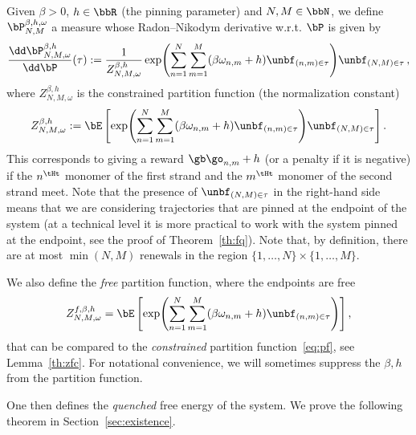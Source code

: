Given $\beta >0$, $h \in \bbR$ (the pinning parameter) and $N,M \in \bbN$, we define $\bP_{N,M}^{\beta,h,\omega}$ a measure whose Radon--Nikodym derivative w.r.t. $\bP$ is given by
\begin{equation}
\frac{\dd \bP_{N,M,\omega}^{\beta,h}}{\dd \bP} (\tau) := \frac{1}{Z_{N,M, \omega}^{\beta,h}} \exp \!\left(\sum_{n=1}^N \sum_{m=1}^M (\beta \omega_{n,m}+h) \unbf_{(n,m) \in \tau} \right)\! \unbf_{(N,M)\in \tau}\,,
\end{equation}
where $Z_{N,M,\omega}^{\beta,h}$ is the constrained partition function (the normalization constant)
\begin{equation}\label{eq:pf}
Z_{N,M,\omega}^{\beta,h} := \bE \left[\exp\! \left(\sum_{n=1}^N \sum_{m=1}^M (\beta \omega_{n,m} +h) \unbf_{(n,m) \in \tau} \right)\! \unbf_{(N,M)\in \tau} \right].
\end{equation}
This corresponds to giving a reward $\gb \go_{n,m}+h$ (or a penalty if it is negative) if the $n^{\tHt}$ monomer of the first strand and the $m^{\tHt}$ monomer of the second strand meet. Note that the presence of $\unbf_{(N,M)\in \tau}$ in the right-hand side means that we are considering trajectories that are pinned at the endpoint of the system (at a technical level it is more practical to work with the system pinned at the endpoint, see the proof of Theorem~\ref{th:fq}). Note that, by definition, there are at most $\min (N,M)$ renewals in the region $\{1,\ldots, N\}\times \{1,\ldots, M\}$.

We also define the \emph{free} partition function, where the endpoints are free
\begin{equation}\label{eq:free}
Z^{f,\beta,h}_{N,M,\omega}= \bE \left[\exp \!\left(\sum_{n=1}^N \sum_{m=1}^M (\beta \omega_{n,m} +h) \unbf_{(n,m) \in \tau} \right) \right],
\end{equation}
that can be compared to the \emph{constrained} partition function~\eqref{eq:pf}, see Lemma~\ref{th:zfc}. For notational convenience, we will sometimes suppress the $\beta,h$ from the partition function.


One then defines the \emph{quenched} free energy of the system. We prove the following theorem in Section~\ref{sec:existence}.

